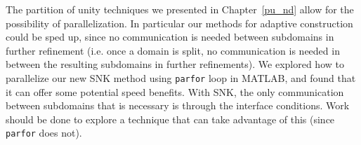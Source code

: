 The partition of unity techniques we presented in Chapter~\ref{pu_nd} allow for the possibility of parallelization. In particular our methods for adaptive construction could be sped up, since no communication is needed between subdomains in further refinement (i.e. once a domain is split, no communication is needed in between the resulting subdomains in further refinements). We explored how to parallelize our new SNK method using {\tt parfor} loop in MATLAB, and found that it can offer some potential speed benefits. With SNK, the only communication between subdomains that is necessary is through the interface conditions. Work should be done to explore a technique that can take advantage of this (since {\tt parfor} does not).


